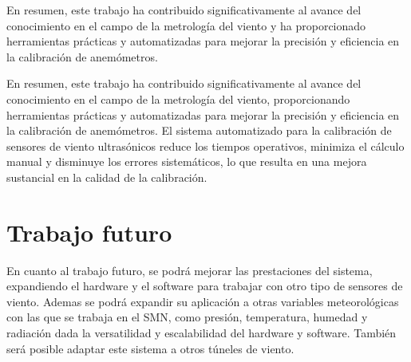 En resumen, este trabajo ha contribuido significativamente al avance del conocimiento en el campo de la metrología del viento y ha proporcionado herramientas prácticas y automatizadas para mejorar la precisión y eficiencia en la calibración de anemómetros.

En resumen, este trabajo ha contribuido significativamente al avance del conocimiento en el campo de la metrología del viento, proporcionando herramientas prácticas y automatizadas para mejorar la precisión y eficiencia en la calibración de anemómetros. El sistema automatizado para la calibración de sensores de viento ultrasónicos reduce los tiempos operativos, minimiza el cálculo manual y disminuye los errores sistemáticos, lo que resulta en una mejora sustancial en la calidad de la calibración.

\section{Trabajo futuro}

En cuanto al trabajo futuro, se podrá mejorar las prestaciones del sistema, expandiendo el hardware y el software para trabajar con otro tipo de sensores de viento. Ademas se podrá expandir su aplicación a otras variables meteorológicas con las que se trabaja en el SMN, como presión, temperatura, humedad y radiación dada la versatilidad y escalabilidad del hardware y software. También será posible adaptar este sistema a otros túneles de viento.



